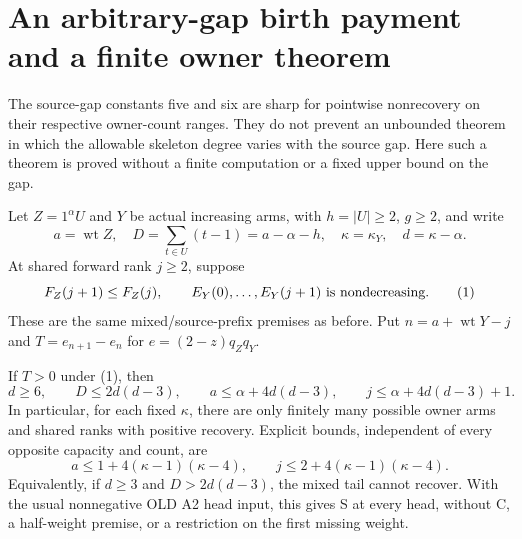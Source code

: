 \section{An arbitrary-gap birth payment and a finite owner theorem}
The source-gap constants five and six are sharp for pointwise
nonrecovery on their respective owner-count ranges. They do not
prevent an unbounded theorem in which the allowable skeleton
degree varies with the source gap. Here such a theorem is proved
without a finite computation or a fixed upper bound on the gap.

Let $Z=1^\alpha U$ and $Y$ be actual increasing arms, with
$h=|U|\ge2$, $g\ge2$, and write
\[
 a=\operatorname{wt}Z,\quad D=\sum_{t\in U}(t-1)=a-\alpha-h,
 \quad\kappa=\kappa_Y,\quad d=\kappa-\alpha.
\]
At shared forward rank $j\ge2$, suppose
\[
 F_Z(j+1)\le F_Z(j),\qquad
 E_Y(0),\ldots,E_Y(j+1)\ \hbox{is nondecreasing}.       \tag{1}
\]
These are the same mixed/source-prefix premises as before.
Put $n=a+\operatorname{wt}Y-j$ and
$T=e_{n+1}-e_n$ for $e=(2-z)q_Zq_Y$.

\begin{theorem}
If $T>0$ under (1), then
\[
 \boxed{d\ge6,\qquad D\le2d(d-3),\qquad
       a\le\alpha+4d(d-3),\qquad
       j\le\alpha+4d(d-3)+1.}                         \tag{2}
\]
In particular, for each fixed $\kappa$, there are only finitely
many possible owner arms and shared ranks with positive recovery.
Explicit bounds, independent of every opposite capacity and count, are
\[
 \boxed{a\le1+4(\kappa-1)(\kappa-4),\qquad
        j\le2+4(\kappa-1)(\kappa-4).}                 \tag{3}
\]
Equivalently, if $d\ge3$ and $D>2d(d-3)$, the mixed tail
cannot recover. With the usual nonnegative OLD A2 head input,
this gives S at every head, without C, a half-weight premise,
or a restriction on the first missing weight.
\end{theorem}

